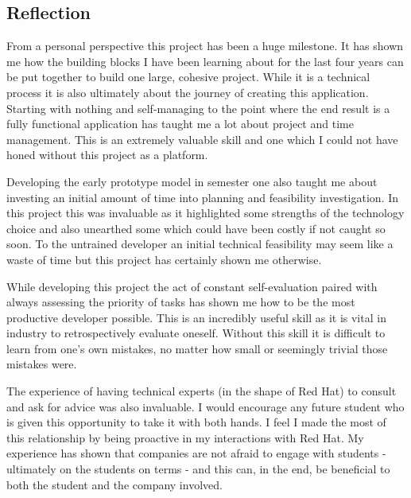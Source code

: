 \subsection{Reflection}
From a personal perspective this project has been a huge milestone. It has shown me how the building blocks I have been learning about for the last four years can be put together to build one large, cohesive project. While it is a technical process it is also ultimately about the journey of creating this application. Starting with nothing and self-managing to the point where the end result is a fully functional application has taught me a lot about project and time management. This is an extremely valuable skill and one which I could not have honed without this project as a platform.

Developing the early prototype model in semester one also taught me about investing an initial amount of time into planning and feasibility investigation. In this project this was invaluable as it highlighted some strengths of the technology choice and also unearthed some which could have been costly if not caught so soon. To the untrained developer an initial technical feasibility may seem like a waste of time but this project has certainly shown me otherwise. 

While developing this project the act of constant self-evaluation paired with always assessing the priority of tasks has shown me how to be the most productive developer possible. This is an incredibly useful skill as it is vital in industry to retrospectively evaluate oneself. Without this skill it is difficult to learn from one's own mistakes, no matter how small or seemingly trivial those mistakes were.

The experience of having technical experts (in the shape of Red Hat) to consult and ask for advice was also invaluable. I would encourage any future student who is given this opportunity to take it with both hands. I feel I made the most of this relationship by being proactive in my interactions with Red Hat. My experience has shown that companies are not afraid to engage with students - ultimately on the students on terms - and this can, in the end, be beneficial to both the student and the company involved.

